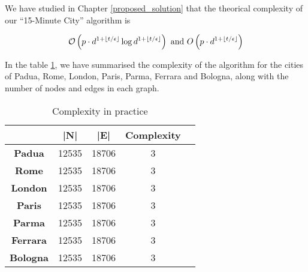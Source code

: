 We have studied in Chapter \ref{proposed_solution} that the theorical complexity of our ``15-Minute City'' algorithm is

$$\mathcal{O}\left(p\cdot d^{1+\floor*{t/\epsilon}}\log d^{1+\floor*{t/\epsilon}}\right)\text{ and }O\left(p\cdot d^{1+\floor*{t/\epsilon}}\right)$$

In the table \ref{tab:complexity}, we have summarised the complexity of the algorithm for the cities of Padua, Rome, London, Paris, Parma, Ferrara and Bologna, along with the number of nodes and edges in each graph.

\begin{table}[htbp]
    \begin{center}
        \caption{Complexity in practice}
        \label{tab:complexity}
        \begin{tabular}{c|cccc}
            \hline
             & \textbf{|N|} & \textbf{|E|} & \textbf{Complexity} \\
            \hline
            \textbf{Padua} & 12535 & 18706 & 3 \\
            \textbf{Rome} & 12535 & 18706 & 3 \\
            \textbf{London} & 12535 & 18706 & 3 \\
            \textbf{Paris} & 12535 & 18706 & 3 \\
            \textbf{Parma} & 12535 & 18706 & 3 \\
            \textbf{Ferrara} & 12535 & 18706 & 3 \\
            \textbf{Bologna} & 12535 & 18706 & 3 \\
            \hline
        \end{tabular}
    \end{center}
\end{table}
